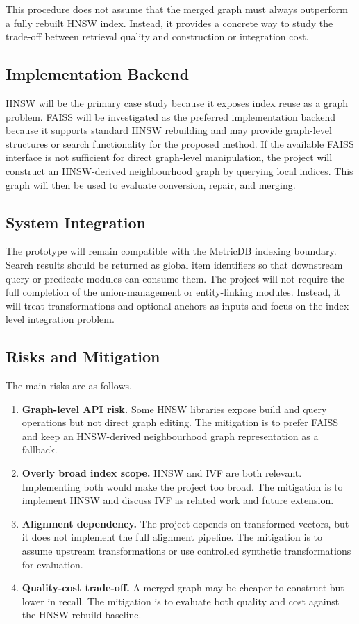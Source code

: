 \documentclass[11pt]{article}
\begin{document}
This procedure does not assume that the merged graph must always outperform a fully rebuilt HNSW index. Instead, it provides a concrete way to study the trade-off between retrieval quality and construction or integration cost.

\subsection{Implementation Backend}

HNSW will be the primary case study because it exposes index reuse as a graph problem. FAISS will be investigated as the preferred implementation backend because it supports standard HNSW rebuilding and may provide graph-level structures or search functionality for the proposed method. If the available FAISS interface is not sufficient for direct graph-level manipulation, the project will construct an HNSW-derived neighbourhood graph by querying local indices. This graph will then be used to evaluate conversion, repair, and merging.

\subsection{System Integration}

The prototype will remain compatible with the MetricDB indexing boundary. Search results should be returned as global item identifiers so that downstream query or predicate modules can consume them. The project will not require the full completion of the union-management or entity-linking modules. Instead, it will treat transformations and optional anchors as inputs and focus on the index-level integration problem.

\subsection{Risks and Mitigation}

The main risks are as follows.

\begin{enumerate}
\item \textbf{Graph-level API risk.} Some HNSW libraries expose build and query operations but not direct graph editing. The mitigation is to prefer FAISS and keep an HNSW-derived neighbourhood graph representation as a fallback.
\item \textbf{Overly broad index scope.} HNSW and IVF are both relevant. Implementing both would make the project too broad. The mitigation is to implement HNSW and discuss IVF as related work and future extension.
\item \textbf{Alignment dependency.} The project depends on transformed vectors, but it does not implement the full alignment pipeline. The mitigation is to assume upstream transformations or use controlled synthetic transformations for evaluation.
\item \textbf{Quality-cost trade-off.} A merged graph may be cheaper to construct but lower in recall. The mitigation is to evaluate both quality and cost against the HNSW rebuild baseline.
\end{enumerate}
\end{document}
